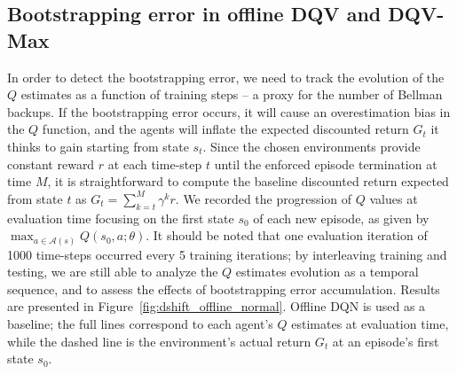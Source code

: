 \subsection{Bootstrapping error in offline DQV and
  DQV-Max}\label{sec:methods_be_dqv_dqvmax}
In order to detect the bootstrapping error, we need to track the
evolution of the $Q$ estimates as a function of training steps -- a
proxy for the number of Bellman backups. If the
bootstrapping error occurs, it will cause an overestimation bias in
the $Q$ function, and the agents will inflate the expected discounted
return $G_t$ it thinks to gain starting from state $s_t$. Since the
chosen environments provide constant reward $r$ at each time-step $t$
until the enforced episode termination at time $M$, it is
straightforward to compute the baseline discounted return expected
from state $t$ as $G_t=\sum^{M}_{k=t}\gamma^{k}r$.
We recorded the progression of $Q$ values at evaluation time focusing
on the first state $s_0$ of each new episode, as given by $\max_{a\in
  \mathcal{A}\left(s\right)}Q\left(s_0,a;\theta\right)$. It should be
noted that one evaluation iteration of 1000 time-steps occurred every
5 training iterations; by interleaving training and testing, we are
still able to analyze the $Q$ estimates evolution as a temporal
sequence, and to assess the effects of bootstrapping error
accumulation. Results are presented in
Figure~\ref{fig:dshift_offline_normal}.
Offline DQN is used as a baseline; the full lines correspond to each
agent's $Q$ estimates at evaluation time, while the dashed line is the
environment's actual return $G_t$ at an episode's first state $s_0$.


